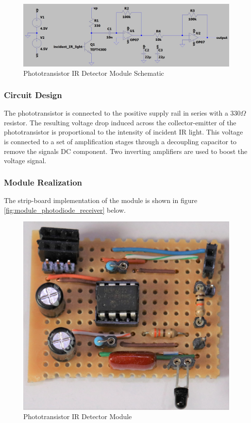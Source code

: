 \begin{figure}[H]
	\centering
	\includegraphics[width=.9\textwidth]{figures/design/phototransistor_detector.JPG}
	\caption{Phototransistor IR Detector Module Schematic}
	\label{fig:schematic_phototransistor_detector}
\end{figure}

\subsubsection{Circuit Design}
The phototransistor is connected to the positive supply rail in series with a $330\Omega$ resistor. The resulting voltage drop induced across the collector-emitter of the phototransistor is proportional to the intensity of incident IR light. This voltage is connected to a set of amplification stages through a decoupling capacitor to remove the signals DC component. Two inverting amplifiers are used to boost the voltage signal.


\subsubsection{Module Realization}
The strip-board implementation of the module is shown in figure \ref{fig:module_photodiode_receiver} below.

\begin{figure}[H]
	\centering
	\includegraphics[width=.6\textwidth]{figures/modules/phototransistor_receiver.jpg}
	\caption{Phototransistor IR Detector Module}
	\label{fig:module_phototransistor_detector}
\end{figure}




